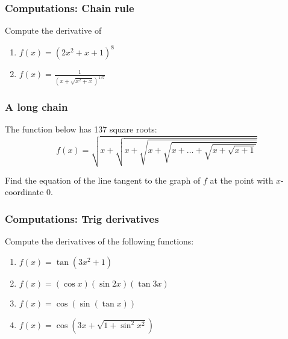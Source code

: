 \documentclass[14pt]{beamer}
\begin{document}
\begin{frame}[t]
	\frametitle{Computations: Chain rule}

	Compute the derivative of

	\begin{enumerate}
		\item $\displaystyle f(x) = \left( 2x^{2}+x+1 \right)^{8}$

		\item $\displaystyle f(x) = \frac{1}{\left( x + \sqrt{x^2+x}\right)^{137}}$
	\end{enumerate}
\end{frame}

\begin{frame}[t]
	\frametitle{A long chain}

	The function below has 137 square roots:
	\[
		f(x) = \sqrt{x+ \sqrt{x +
		\sqrt{x + \sqrt{x+ \ldots + \sqrt{x + \sqrt{x+1}}}}}}
	\]

	Find the equation of the line tangent to the graph of $f$ at the point with
	$x$-coordinate $0$.
\end{frame}

\begin{frame}[t]
	\frametitle{Computations: Trig derivatives}

	Compute the derivatives of the following functions:

	\begin{enumerate}

		\item $\displaystyle f(x) = \tan (3x^{2}+1)$

			\vfill

		\item $\displaystyle f(x) = (\cos x )( \sin 2x )(\tan 3x)$

			\vfill

		\item $\displaystyle f(x) = \cos ( \sin( \tan x))$
			\vfill

		\item $\displaystyle f(x) = \cos \left( 3x + \sqrt{1 + \sin^{2}x^{2}}\right)$
			\vfill
	\end{enumerate}
\end{frame}
\end{document}
